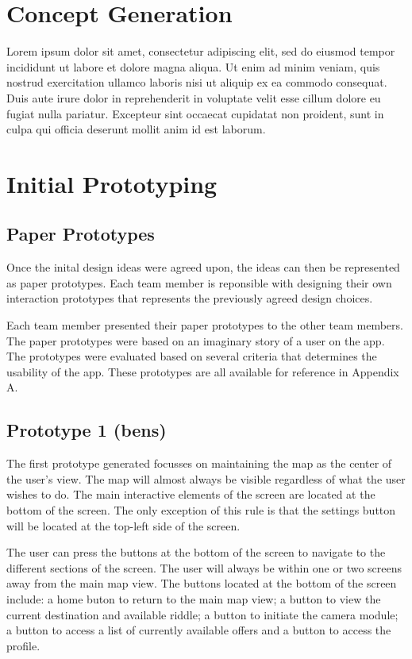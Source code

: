\documentclass[10pt,twocolumn]{article} %
\begin{document}
\section*{Concept Generation}
Lorem ipsum dolor sit amet, consectetur adipiscing elit, sed do eiusmod tempor incididunt ut labore et dolore magna aliqua. Ut enim ad minim veniam, quis nostrud exercitation ullamco laboris nisi ut aliquip ex ea commodo consequat. Duis aute irure dolor in reprehenderit in voluptate velit esse cillum dolore eu fugiat nulla pariatur. Excepteur sint occaecat cupidatat non proident, sunt in culpa qui officia deserunt mollit anim id est laborum.

\section*{Initial Prototyping} 
\subsection*{Paper Prototypes}
Once the inital design ideas were agreed upon, the ideas can then be represented as paper prototypes. Each team member is reponsible with designing their own interaction prototypes that represents the previously agreed design choices.

Each team member presented their paper prototypes to the other team members. The paper prototypes were based on an imaginary story of a user on the app. The prototypes were evaluated based on several criteria  that determines the usability of the app. These prototypes are all available for reference in Appendix A.

\subsection*{Prototype 1 (bens)}
The first prototype generated focusses on maintaining the map as the center of the user's view. The map will almost always be visible regardless of what the user wishes to do. The main interactive elements of the screen are located at the bottom of the screen. The only exception of this rule is that the settings button will be located at the top-left side of the screen.

The user can press the buttons at the bottom of the screen to navigate to the different sections of the screen. The user will always be within one or two screens away from the main map view. The buttons located at the bottom of the screen include: a home buton to return to the main map view; a button to view the current destination and available riddle; a button to initiate the camera module; a button to access a list of currently available offers and a button to access the profile.
\end{document}
